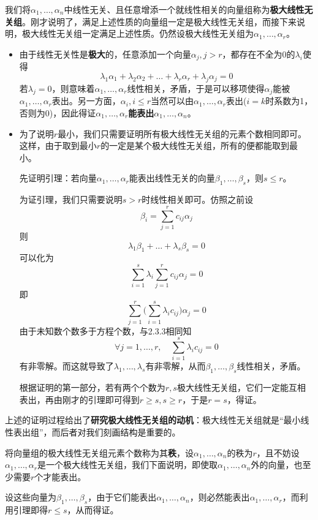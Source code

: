 \documentclass[a4paper,UTF8,fontset=windows]{ctexart}
\begin{document}
我们将$\alpha_1,\dots,\alpha_n$中线性无关、且任意增添一个就线性相关的向量组称为\textbf{极大线性无关组}。刚才说明了，满足上述性质的向量组一定是极大线性无关组，而接下来说明，极大线性无关组一定满足上述性质。仍然设极大线性无关组为$\alpha_1,\dots,\alpha_r$。
\begin{itemize}
    \item 由于线性无关性是\textbf{极大}的，任意添加一个向量$\alpha_j,j>r$，都存在不全为0的$\lambda_i$使得
    $$\lambda_1\alpha_1+\lambda_2\alpha_2+\dots+\lambda_r\alpha_r+\lambda_j\alpha_j=0$$
    若$\lambda_j=0$，则意味着$\alpha_1,\dots,\alpha_r$线性相关，矛盾，于是可以移项使得$\alpha_j$能被$\alpha_1,\dots,\alpha_r$表出。另一方面，$\alpha_i,i\le r$当然可以由$\alpha_1,\dots,\alpha_r$表出($i=k$时系数为1，否则为0)，因此得证$\alpha_1,\dots,\alpha_r$\textbf{能表出}$\alpha_1,\dots,\alpha_n$。

    \item 为了说明$r$最小，我们只需要证明所有极大线性无关组的元素个数相同即可。这样，由于取到最小$r$的一定是某个极大线性无关组，所有的便都能取到最小。
    
    先证明引理：若向量$\alpha_1,\dots,\alpha_r$能表出线性无关的向量$\beta_1,\dots,\beta_s$，则$s\le r$。

    为证引理，我们只需要说明$s>r$时线性相关即可。仿照之前设
    $$\beta_i=\sum_{j=1}^rc_{ij}\alpha_j$$
    则
    $$\lambda_1\beta_1+\dots+\lambda_s\beta_s=0$$
    可以化为
    $$\sum_{i=1}^s\lambda_i\sum_{j=1}^rc_{ij}\alpha_j=0$$
    即
    $$\sum_{j=1}^r\bigg(\sum_{i=1}^s\lambda_ic_{ij}\bigg)\alpha_j=0$$
    由于未知数个数多于方程个数，与2.3.3相同知
    $$\forall j=1,\dots, r,\quad\sum_{i=1}^s\lambda_ic_{ij}=0$$
    有非零解。而这就导致了$\lambda_1,\dots,\lambda_s$有非零解，从而$\beta_1,\dots,\beta_s$线性相关，矛盾。

    根据证明的第一部分，若有两个个数为$r,s$极大线性无关组，它们一定能互相表出，再由刚才的引理即可得到$r\ge s,s\ge r$，于是$r=s$，得证。
\end{itemize}

上述的证明过程给出了\textbf{研究极大线性无关组的动机}：极大线性无关组就是``最小线性表出组''，而后者对我们刻画结构是重要的。

将向量组的极大线性无关组元素个数称为其\textbf{秩}，设$\alpha_1,\dots,\alpha_n$的秩为$r$，且不妨设$\alpha_1,\dots,\alpha_r$是一个极大线性无关组，我们下面说明，即使取$\alpha_1,\dots,\alpha_n$外的向量，也至少需要$r$个才能表出。

设这些向量为$\beta_1,\dots,\beta_s$，由于它们能表出$\alpha_1,\dots,\alpha_n$，则必然能表出$\alpha_1,\dots,\alpha_r$，而利用引理即得$r\le s$，从而得证。
\end{document}
